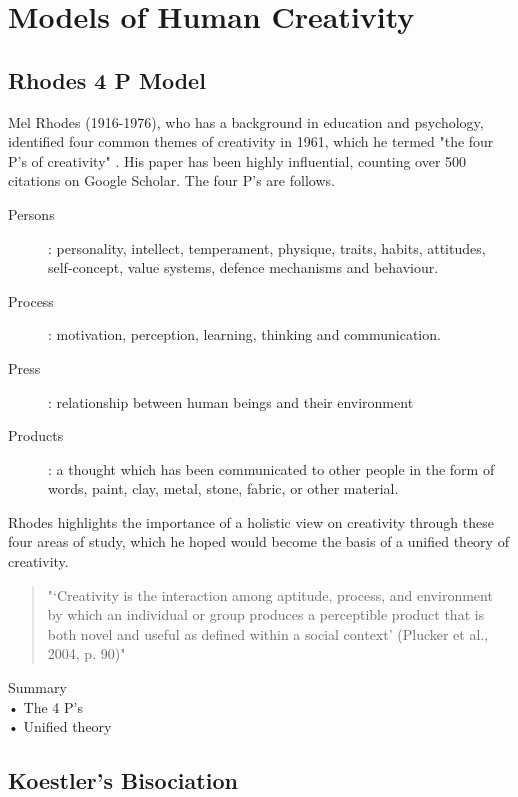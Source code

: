 \section{Models of Human Creativity}

\subsection{Rhodes 4 P Model}

Mel Rhodes (1916-1976), who has a background in education and psychology, identified four common themes of creativity in 1961, which he termed "the four P’s of creativity" \citep{Rhodes1961}. His paper has been highly influential, counting over 500 citations on Google Scholar. The four P’s are follows.

\begin{description}
  \item [Persons]: personality, intellect, temperament, physique, traits, habits, attitudes, self-concept, value systems, defence mechanisms and behaviour.
  \item [Process]: motivation, perception, learning, thinking and communication.
  \item [Press]: relationship between human beings and their environment
  \item [Products]: a thought which has been communicated to other people in the form of words, paint, clay, metal, stone, fabric, or other material.
\end{description}

Rhodes highlights the importance of a holistic view on creativity through these four areas of study, which he hoped would become the basis of a unified theory of creativity.

\begin{quote}
  "‘Creativity is the interaction among aptitude, process, and environment by which an individual or group produces a perceptible product that is both novel and useful as defined within a social context’ (Plucker et al., 2004, p. 90)" \citep{Jordanous2012}
\end{quote}

\begin{shaded}
  Summary\\
  •	The 4 P’s\\
  •	Unified theory
\end{shaded}

\subsection{Koestler's Bisociation}

